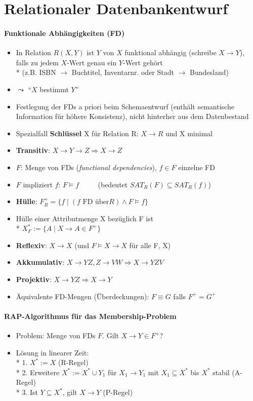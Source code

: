 \section{Relationaler Datenbankentwurf}
\label{sec:abbildenRelational}

\paragraph{Funktionale Abhängigkeiten (FD)}
\begin{itemize}
	\item In Relation \( R(X,Y) \) ist \( Y \) von \( X \) funktional abhängig (schreibe \( X \to Y \)), falls zu jedem \( X \)-Wert genau ein \( Y \)-Wert gehört \\*
	 (z.B. ISBN $\to$ Buchtitel, Inventarnr. oder Stadt $\to$ Bundesland)
	\item \( \leadsto \) ``\( X \) bestimmt \( Y \)''
	\item Festlegung der FDs a priori beim Schemaentwurf (enthält semantische Information für höhere Konsistenz), nicht hinterher aus dem Datenbestand
	\item Spezialfall \textbf{Schlüssel} X für Relation R: $X \to R$ und X minimal
	\item \textbf{Transitiv}: $X \to  Y  \to  Z \Rightarrow  X  \to Z$
	\item \( F \): Menge von FDs (\emph{functional dependencies}), \( f \in F \) einzelne FD
	\item \( F \) impliziert \( f \): \( F \models f \)   $\qquad$  (bedeutet $SAT_R(F) \subseteq SAT_R(f)$)
	\item \textbf{Hülle}: \( F_R^+ = \{ f \mid (f \text{ FD über} R) \wedge F \models f \} \)
	\item Hülle einer Attributmenge X bezüglich F ist \\*
	$X^*_F := \{ A \mid X \to A \in F^+ \}$
	\item \textbf{Reflexiv}: $X \to X$ (und $F \models X \to X$ für alle F, X)
	\item \textbf{Akkumulativ}: $X \to YZ, Z \to VW \Rightarrow X \to YZV$
	\item \textbf{Projektiv}: $X \to YZ \Rightarrow X \to Y$
	\item Äquivalente FD-Mengen (Überdeckungen): \( F \equiv G \) falls \( F^+ = G^+ \)
\end{itemize}

\paragraph{RAP-Algorithmus für das Membership-Problem}
\begin{itemize}
	\item  Problem: Menge von FDs $F$. Gilt $X \to Y \in F^+$?
	\item Lösung in linearer Zeit: \\*
		1. $X^* :=  X$ (R-Regel) \\*
		2. Erweitere $X^* := X^* \cup Y_1$ für $X_1 \to Y_1$ mit $X_1 \subseteq X^*$ bis $X^*$ stabil (A-Regel) \\*
		3. Ist $Y \subseteq X^*$, gilt $X \to Y$ (P-Regel)
\end{itemize}

